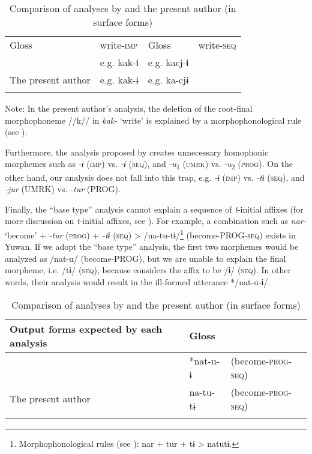 \begin{table}
\caption{\label{tab:key:69} Comparison of analyses by \citet{UchimaEtAl1976} and the present author (in surface forms)}
\begin{tabular}{ll ll}
\lsptoprule
  Gloss  & write-\textsc{imp}  &    Gloss&   write-\textsc{seq}\\
\citet{UchimaEtAl1976} &  e.g.  kak-ɨ &    e.g.  kacj-ɨ\\
The present author&   e.g.  kak-ɨ   &  e.g.  ka-cjɨ\\
\lspbottomrule
\end{tabular}
Note: In the present author’s analysis, the deletion of the root-final morphophoneme //k// in \textit{kak-} ‘write’ is explained by a morphophonological rule (see ).
\end{table}

  Furthermore, the analysis proposed by \citet{UchimaEtAl1976} creates unnecessary homophonic morphemes such as \textit{-ɨ} (\textsc{imp}) vs. \textit{-ɨ} (\textsc{seq}), and \textit{-u}\textsubscript{1} (\textsc{umrk}) vs. \textit{-u}\textsubscript{2} (\textsc{prog}). On the other hand, our analysis does not fall into this trap, e.g. \textit{-ɨ} (\textsc{imp}) vs. \textit{-tɨ} (\textsc{seq}), and \textit{-jur} (UMRK) vs. \textit{-tur} (PROG).

  Finally, the “base type” analysis cannot explain a sequence of \textit{t}-initial affixes (for more discussion on \textit{t}-initial affixes, see ). For example, a combination such as \textit{nar-} ‘become’ + \textit{-tur} (\textsc{prog}) + \textit{-tɨ} (\textsc{seq}) > /na-tu-tɨ/\footnote{Morphophonological rules (see ): nar + tur + tɨ > natutɨ.} (become-PROG-\textsc{seq}) exists in Yuwan. If we adopt the “base type” analysis, the first two morphemes would be analyzed as /nat-u/ (become-PROG), but we are unable to explain the final morpheme, i.e. /tɨ/ (\textsc{seq}), because \citet[91-92]{UchimaEtAl1976} considers the affix to be /ɨ/ (\textsc{seq}). In other words, their analysis would result in the ill-formed utterance */nat-u-ɨ/.

\begin{table}
\caption{\label{tab:key:70} Comparison of analyses by \citet{UchimaEtAl1976} and the present author (in surface forms)}
\begin{tabular}{lll}
\lsptoprule
Output forms expected by each analysis &  Gloss\\
\midrule
\citet{UchimaEtAl1976}&  *nat-u-ɨ&  (become-\textsc{prog}-\textsc{seq})\\
The present author    & na-tu-tɨ & (become-\textsc{prog}-\textsc{seq})\\
\lspbottomrule
\end{tabular}
\end{table}

